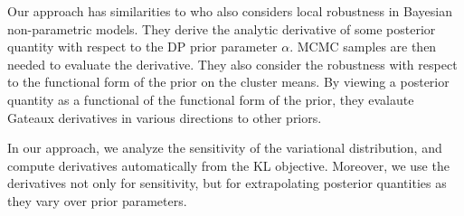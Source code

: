 %
Our approach has similarities to \citet{Basu:2000:BNP_robustness} who also
considers local robustness in Bayesian non-parametric models. They derive the
analytic derivative of some posterior quantity with respect to the DP prior
parameter $\alpha$. MCMC samples are then needed to evaluate the derivative.
They also consider the robustness with respect to the functional form of the
prior on the cluster means.  By viewing a posterior quantity as a functional of
the functional form of the prior, they evalaute Gateaux derivatives in various
directions to other priors.

In our approach, we analyze the sensitivity of the variational distribution, and
compute derivatives automatically from the KL objective. Moreover, we use the
derivatives not only for sensitivity, but for extrapolating posterior quantities
as they vary over prior parameters.
